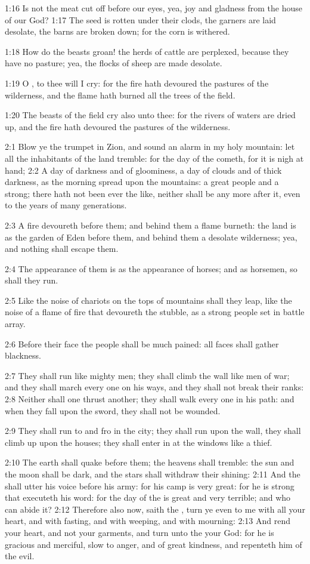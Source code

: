 1:16 Is not the meat cut off before our eyes, yea, joy and gladness from the house of our God?  1:17 The seed is rotten under their clods, the garners are laid desolate, the barns are broken down; for the corn is withered.

1:18 How do the beasts groan! the herds of cattle are perplexed, because they have no pasture; yea, the flocks of sheep are made desolate.

1:19 O \LORD, to thee will I cry: for the fire hath devoured the pastures of the wilderness, and the flame hath burned all the trees of the field.

1:20 The beasts of the field cry also unto thee: for the rivers of waters are dried up, and the fire hath devoured the pastures of the wilderness.

2:1 Blow ye the trumpet in Zion, and sound an alarm in my holy mountain: let all the inhabitants of the land tremble: for the day of the \LORD cometh, for it is nigh at hand; 2:2 A day of darkness and of gloominess, a day of clouds and of thick darkness, as the morning spread upon the mountains: a great people and a strong; there hath not been ever the like, neither shall be any more after it, even to the years of many generations.

2:3 A fire devoureth before them; and behind them a flame burneth: the land is as the garden of Eden before them, and behind them a desolate wilderness; yea, and nothing shall escape them.

2:4 The appearance of them is as the appearance of horses; and as horsemen, so shall they run.

2:5 Like the noise of chariots on the tops of mountains shall they leap, like the noise of a flame of fire that devoureth the stubble, as a strong people set in battle array.

2:6 Before their face the people shall be much pained: all faces shall gather blackness.

2:7 They shall run like mighty men; they shall climb the wall like men of war; and they shall march every one on his ways, and they shall not break their ranks: 2:8 Neither shall one thrust another; they shall walk every one in his path: and when they fall upon the sword, they shall not be wounded.

2:9 They shall run to and fro in the city; they shall run upon the wall, they shall climb up upon the houses; they shall enter in at the windows like a thief.

2:10 The earth shall quake before them; the heavens shall tremble: the sun and the moon shall be dark, and the stars shall withdraw their shining: 2:11 And the \LORD shall utter his voice before his army: for his camp is very great: for he is strong that executeth his word: for the day of the \LORD is great and very terrible; and who can abide it?  2:12 Therefore also now, saith the \LORD, turn ye even to me with all your heart, and with fasting, and with weeping, and with mourning: 2:13 And rend your heart, and not your garments, and turn unto the \LORD your God: for he is gracious and merciful, slow to anger, and of great kindness, and repenteth him of the evil.

